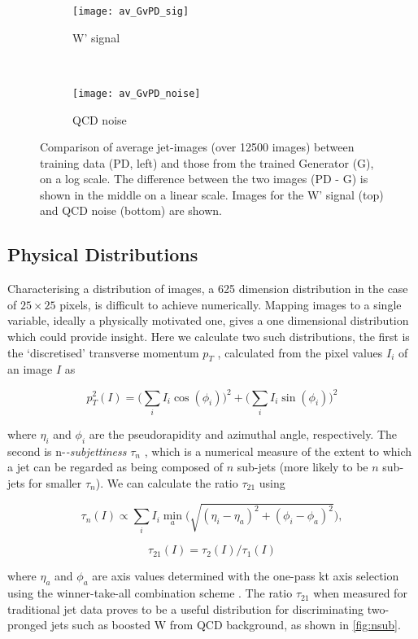 \documentclass[twocolumn,twoside]{article}
\begin{document}
\begin{figure}[H]
	\centering
	\begin{subfigure}[t]{1.0\linewidth}
		\centering
		\texttt{[image: av\_GvPD\_sig]}
		\caption{W' signal}
	\end{subfigure}%
	\\
	\begin{subfigure}[t]{1.0\linewidth}
		\centering
		\texttt{[image: av\_GvPD\_noise]}
		\caption{QCD noise}
	\end{subfigure}
	
	\caption{Comparison of average jet-images (over \num{12500} images) between training data (PD, left) and those from the trained Generator (G), on a log scale. The difference between the two images (PD - G) is shown in the middle on a linear scale. Images for the W' signal (top) and QCD noise (bottom) are shown.}
	\label{fig:pdvg}
\end{figure}

\subsection{Physical Distributions}
\label{sec:physical}
Characterising a distribution of images, a 625 dimension distribution in the case of $25\times25$ pixels, is difficult to achieve numerically. Mapping images to a single variable, ideally a physically motivated one, gives a one dimensional distribution which could provide insight. Here we calculate two such distributions, the first is the `discretised' transverse momentum $p_T$ \cite{de2017learning}, calculated from the pixel values $I_i$ of an image $I$ as 

$$
p_T^2(I) = \bigg(\sum_i I_i \cos(\phi_i)\bigg)^2 + \bigg(\sum_i I_i \sin(\phi_i)\bigg)^2
$$

where $\eta_i$ and $\phi_i$ are the pseudorapidity and azimuthal angle, respectively. The second is n-\textit{-subjettiness} $\tau_{n}$ \cite{nsubjettiness}, which is a numerical measure of the extent to which a jet can be regarded as being composed of $n$ sub-jets (more likely to be $n$ sub-jets for smaller $\tau_n$). We can calculate the ratio $\tau_{21}$ using

$$
\tau_n (I) \propto \sum_i I_i \min_a \bigg(\sqrt{(\eta_i - \eta_a)^2 + (\phi_i - \phi_a)^2}\bigg),
$$

$$
\tau_{21} (I) = \tau_2 (I) / \tau_1 (I)
$$

where $\eta_a$ and $\phi_a$ are axis values determined with the one-pass kt axis selection using the winner-take-all combination scheme \cite{axis}. The ratio $\tau_{21}$ when measured for traditional jet data proves to be a useful distribution for discriminating two-pronged jets such as boosted W from QCD background, as shown in \cref{fig:nsub}.
\end{document}
